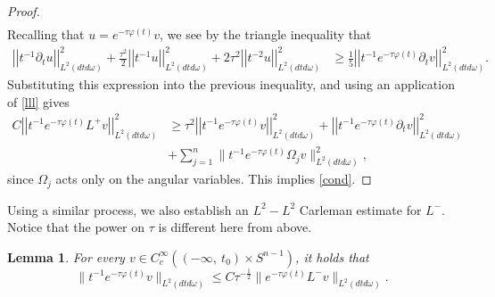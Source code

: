 \documentclass[11pt]{amsart}
\theoremstyle{plain}
\newtheorem{lemma}{Lemma}
\numberwithin{equation}{section}
\begin{document}
\begin{proof}
\begin{align*}
\end{align*}
Recalling that $u = e^{- \tau {\varphi}{\left( {t} \right) }} v$, 
we see by the triangle inequality that
\begin{align*}
{\left\vert\left\vert {t^{-1}{ \partial}_t u }\right\vert\right\vert}^2_{L^2(dtd\omega)}
+  \frac{\tau^2}{2} {\left\vert\left\vert {t^{-1} u}\right\vert\right\vert}^2_{L^2(dtd\omega)}
+  2\tau^2 {\left\vert\left\vert {t^{-2}  u }\right\vert\right\vert}^2_{L^2(dtd\omega)}
&\ge \frac 1 5 {\left\vert\left\vert {t^{-1}e^{- \tau {\varphi}{\left( {t} \right) }}\partial_t v }\right\vert\right\vert}^2_{L^2(dtd\omega)} .
\end{align*}
Substituting this expression into the previous inequality, and using an application of \eqref{lll} gives
\begin{align*}
C {\left\vert\left\vert {t^{-1} e^{-\tau\varphi(t)}L^+v}\right\vert\right\vert}^2_{L^2(dtd\omega)}
&\ge \tau^2 {\left\vert\left\vert {t^{-1}e^{- \tau {\varphi}{\left( {t} \right) }} v}\right\vert\right\vert}^2_{L^2(dtd\omega)}
+ {\left\vert\left\vert {t^{-1}e^{- \tau {\varphi}{\left( {t} \right) }}\partial_t v }\right\vert\right\vert}^2_{L^2(dtd\omega)} \\
&+ \sum_{j=1}^n\| t^{-1} e^{- \tau {\varphi}{\left( {t} \right) }} \Omega_j  v\|^2_{L^2(dtd\omega)},
\end{align*}
since ${\Omega}_j$ acts only on the angular variables.
This implies \eqref{cond}.
\end{proof}

Using a similar process, we also establish an $L^2 - L^2$ Carleman estimate for $L^-$.
Notice that the power on $\tau$ is different here from above.

\begin{lemma}
For every $v \in C^{\infty}_c{\left( {(-\infty, \ t_0)\times S^{n-1}} \right) }$, it
holds that
\begin{equation}
\|t^{-{1}} e^{-\tau \varphi(t)} v\|_{L^2(dtd\omega)} \leq C
\tau^{-\frac 1 2} \| e^{-\tau \varphi(t)} L^- v\|_{L^2(dtd\omega)}.
\label{key-q22}
\end{equation}
\label{CarL-qq}
\end{lemma}
\end{document}
